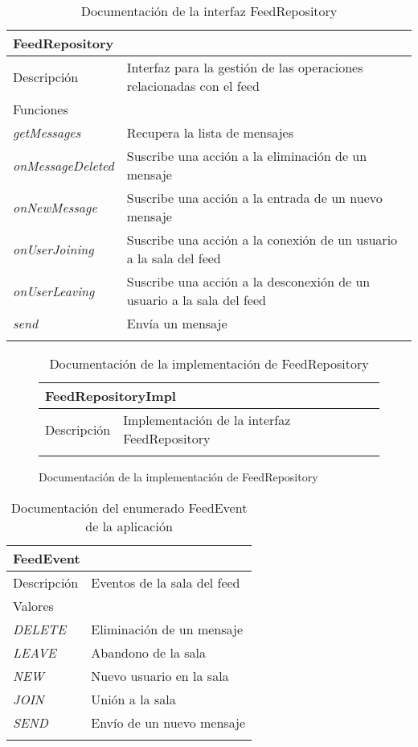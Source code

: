 \begin{longtable}{|p{} p{}|}
    \hline
    \multicolumn{2}{|l|}{\textbf{FeedRepository}} \\ \hline \hline
    Descripción      & Interfaz para la gestión de las operaciones relacionadas con el feed \\ \hline
    \multicolumn{2}{|l|}{Funciones} \\
    \emph{getMessages}  & Recupera la lista de mensajes \\
    \emph{onMessageDeleted}  & Suscribe una acción a la eliminación de un mensaje \\
    \emph{onNewMessage}  & Suscribe una acción a la entrada de un nuevo mensaje \\
    \emph{onUserJoining}  & Suscribe una acción a la conexión de un usuario a la sala del feed \\
    \emph{onUserLeaving}  & Suscribe una acción a la desconexión de un usuario a la sala del feed \\
    \emph{send}  & Envía un mensaje \\ \hline
    \caption{Documentación de la interfaz FeedRepository}
    \label{dis:app:feed_repository}
\end{longtable}

\begin{figure}[H]
\begin{longtable}{|p{} p{}|}
    \hline
    \multicolumn{2}{|l|}{\textbf{FeedRepositoryImpl}} \\ \hline \hline
    Descripción      & Implementación de la interfaz FeedRepository \\ \hline
    \caption{Documentación de la implementación de FeedRepository}
    \label{dis:app:feed_repository_impl}
\end{longtable}
\end{figure}

\begin{longtable}{|p{} p{}|}
    \hline
    \multicolumn{2}{|l|}{\textbf{FeedEvent}} \\ \hline \hline
    Descripción      & Eventos de la sala del feed \\ \hline
    \multicolumn{2}{|l|}{Valores} \\
    \emph{DELETE}  & Eliminación de un mensaje  \\
    \emph{LEAVE}  & Abandono de la sala  \\
    \emph{NEW}  & Nuevo usuario en la sala  \\
    \emph{JOIN}  & Unión a la sala  \\
    \emph{SEND}  & Envío de un nuevo mensaje  \\ \hline
    \caption{Documentación del enumerado FeedEvent de la aplicación}
    \label{dis:app:feed_event}
\end{longtable}

